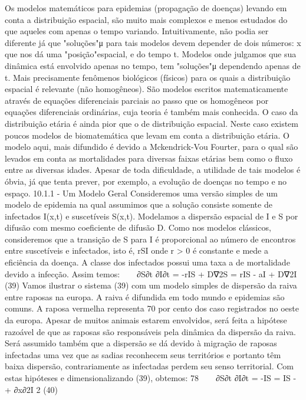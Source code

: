 {{{{{{{{{{{{{{{{{{{{{{{{Os modelos matemáticos para epidemias (propagação de doenças) levando em conta a distribuição espacial, são muito mais complexos e menos estudados do que aqueles com apenas o tempo variando. Intuitivamente, não podia ser diferente já que "soluções"μ para tais modelos devem depender de dois números: x que nos dá uma "posição"espacial, e do tempo t. Modelos onde julgamos que sua dinâmica está envolvido apenas no tempo, tem "soluções"μ dependendo apenas de t. Mais precisamente fenômenos biológicos (físicos) para os quais a distribuição espacial é relevante (não homogêneos). São modelos escritos matematicamente através de equações diferenciais parciais ao passo que os homogêneos por equações diferenciais ordinárias, cuja teoria é também mais conhecida. 
O caso da distribuição etária é ainda pior que o de distribuição espacial. Neste caso existem poucos modelos de biomatemática que levam em conta a distribuição etária. O modelo aqui, mais difundido é devido a Mckendrick-Vou Fourter, para o qual são levados em conta as mortalidades para diversas faixas etárias bem como o fluxo entre as diversas idades. 
Apesar de toda dificuldade, a utilidade de tais modelos é óbvia, já que tenta prever, por exemplo, a evolução de doenças no tempo e no espaço. 
10.1.1 - Um Modelo Geral 
Consideremos uma versão simples de um modelo de epidemia na qual assumimos que a solução consiste somente de infectados I(x,t) e suscetíveis S(x,t). Modelamos a dispersão espacial de I e S por difusão com mesmo coeficiente de difusão D. Como nos modelos clássicos, consideremos que a transição de S para I é proporcional ao número de encontros entre suscetíveis e infectados, isto é, rSI onde r > 0 é constante e mede a eficiência da doença. A classe dos infectados possui uma taxa a de mortalidade devido a infecção. Assim temos: 
 
∂S∂t ∂I∂t = -rIS + D∇2S 
= rIS - aI + D∇2I 
(39) 
Vamos ilustrar o sistema (39) com um modelo simples de dispersão da raiva entre raposas na europa. 
A raiva é difundida em todo mundo e epidemias são comuns. A raposa vermelha representa 70 por cento dos caso registrados no oeste da europa. Apesar de muitos animais estarem envolvidos, será feita a hipótese razoável de que as raposas são responsáveis pela dinâmica da dispersão da raiva. Será assumido também que a dispersão se dá devido à migração de raposas infectadas uma vez que as sadias reconhecem seus territórios e portanto têm baixa dispersão, contrariamente as infectadas perdem seu senso territorial. Com estas hipóteses e dimensionalizando (39), obtemos: 
78 
 
∂S∂t ∂I∂t = -IS 
= IS - \lambdaI + ∂x∂2I 2 
(40) 
}}}}}}}}}}}}}}}}}}}}}}}}
